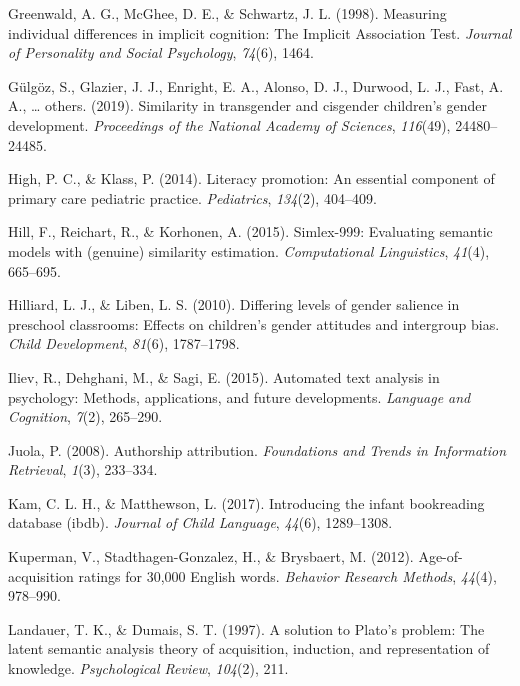 \documentclass[english,,man,floatsintext]{apa6}
\begin{document}
\leavevmode\hypertarget{ref-greenwald1998measuring}{}%
Greenwald, A. G., McGhee, D. E., \& Schwartz, J. L. (1998). Measuring individual differences in implicit cognition: The Implicit Association Test. \emph{Journal of Personality and Social Psychology}, \emph{74}(6), 1464.

\leavevmode\hypertarget{ref-gulgoz2019similarity}{}%
Gülgöz, S., Glazier, J. J., Enright, E. A., Alonso, D. J., Durwood, L. J., Fast, A. A., \ldots{} others. (2019). Similarity in transgender and cisgender children's gender development. \emph{Proceedings of the National Academy of Sciences}, \emph{116}(49), 24480--24485.

\leavevmode\hypertarget{ref-high2014literacy}{}%
High, P. C., \& Klass, P. (2014). Literacy promotion: An essential component of primary care pediatric practice. \emph{Pediatrics}, \emph{134}(2), 404--409.

\leavevmode\hypertarget{ref-hill2015simlex}{}%
Hill, F., Reichart, R., \& Korhonen, A. (2015). Simlex-999: Evaluating semantic models with (genuine) similarity estimation. \emph{Computational Linguistics}, \emph{41}(4), 665--695.

\leavevmode\hypertarget{ref-hilliard2010differing}{}%
Hilliard, L. J., \& Liben, L. S. (2010). Differing levels of gender salience in preschool classrooms: Effects on children's gender attitudes and intergroup bias. \emph{Child Development}, \emph{81}(6), 1787--1798.

\leavevmode\hypertarget{ref-iliev2015automated}{}%
Iliev, R., Dehghani, M., \& Sagi, E. (2015). Automated text analysis in psychology: Methods, applications, and future developments. \emph{Language and Cognition}, \emph{7}(2), 265--290.

\leavevmode\hypertarget{ref-juola2008authorship}{}%
Juola, P. (2008). Authorship attribution. \emph{Foundations and Trends in Information Retrieval}, \emph{1}(3), 233--334.

\leavevmode\hypertarget{ref-kam_2017}{}%
Kam, C. L. H., \& Matthewson, L. (2017). Introducing the infant bookreading database (ibdb). \emph{Journal of Child Language}, \emph{44}(6), 1289--1308.

\leavevmode\hypertarget{ref-kuperman2012age}{}%
Kuperman, V., Stadthagen-Gonzalez, H., \& Brysbaert, M. (2012). Age-of-acquisition ratings for 30,000 English words. \emph{Behavior Research Methods}, \emph{44}(4), 978--990.

\leavevmode\hypertarget{ref-landauer1997solution}{}%
Landauer, T. K., \& Dumais, S. T. (1997). A solution to Plato's problem: The latent semantic analysis theory of acquisition, induction, and representation of knowledge. \emph{Psychological Review}, \emph{104}(2), 211.
\end{document}
